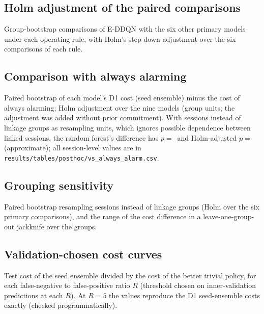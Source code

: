 \subsection{Holm adjustment of the paired comparisons}
Group-bootstrap comparisons of E-DDQN with the six other primary models under each operating rule, with Holm's step-down adjustment over the six comparisons of each rule.

\begin{center}\footnotesize

\end{center}

\subsection{Comparison with always alarming}
Paired bootstrap of each model's D1 cost (seed ensemble) minus the cost of always alarming; Holm adjustment over the nine models (group units; the adjustment was added without prior commitment). With sessions instead of linkage groups as resampling units, which ignores possible dependence between linked sessions, the random forest's difference has $p=$\,\PHAlwRFSesP{} and Holm-adjusted $p=$\,\PHAlwRFSesHolm{} (approximate); all session-level values are in \texttt{results/\allowbreak tables/\allowbreak posthoc/\allowbreak vs\_always\_alarm.csv}.

\begin{center}\footnotesize
\resizebox{\textwidth}{!}{}
\end{center}

\subsection{Grouping sensitivity}
Paired bootstrap resampling sessions instead of linkage groups (Holm over the six primary comparisons), and the range of the cost difference in a leave-one-group-out jackknife over the \nGroupsEval{} groups.

\begin{center}\footnotesize
\resizebox{\textwidth}{!}{}
\end{center}

\subsection{Validation-chosen cost curves}
Test cost of the seed ensemble divided by the cost of the better trivial policy, for each false-negative to false-positive ratio $R$ (threshold chosen on inner-validation predictions at each $R$). At $R=5$ the values reproduce the D1 seed-ensemble costs exactly (checked programmatically).

